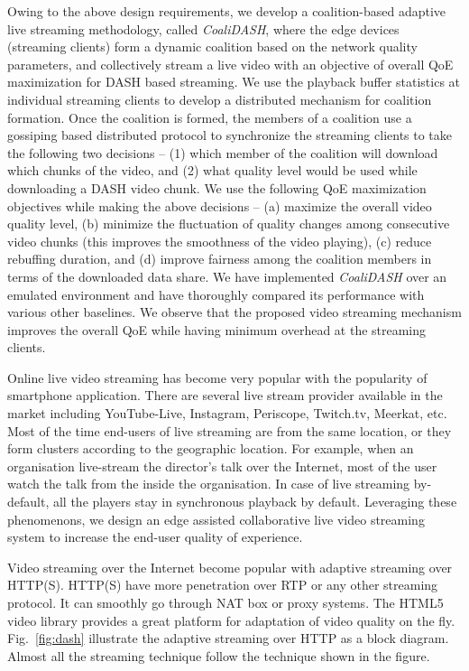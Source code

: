 Owing to the above design requirements, we develop a coalition-based adaptive live streaming methodology, called \textit{CoaliDASH}, where the edge devices (streaming clients) form a dynamic coalition based on the network quality parameters, and collectively stream a live video with an objective of overall QoE maximization for DASH based streaming. We use the playback buffer statistics at individual streaming clients to develop a distributed mechanism for coalition formation. Once the coalition is formed, the members of a coalition use a gossiping based distributed protocol to synchronize the streaming clients to take the following two decisions -- (1) which member of the coalition will download which chunks of the video, and (2) what quality level would be used while downloading a DASH video chunk. We use the following QoE maximization objectives while making the above decisions -- (a) maximize the overall video quality level, (b) minimize the fluctuation of quality changes among consecutive video chunks (this improves the smoothness of the video playing), (c) reduce rebuffing duration, and (d) improve fairness  among the coalition members in terms of the downloaded data share. We have implemented \textit{CoaliDASH} over an emulated environment and have thoroughly compared its performance with various other baselines. We observe that the proposed video streaming mechanism improves the overall QoE while having minimum overhead at the streaming clients. 


Online live video streaming has become very popular with the popularity of smartphone application. There are several live stream provider available in the market including YouTube-Live, Instagram, Periscope, Twitch.tv, Meerkat, etc. Most of the time end-users of live streaming are from the same location, or they form clusters according to the geographic location. For example, when an organisation live-stream the director's talk over the Internet, most of the user watch the talk from the inside the organisation. In case of live streaming by-default, all the players stay in synchronous playback by default. Leveraging these phenomenons, we design an edge assisted collaborative live video streaming system to increase the end-user quality of experience.

Video streaming over the Internet become popular with adaptive streaming over HTTP(S). HTTP(S) have more penetration over RTP or any other streaming protocol. It can smoothly go through NAT box or proxy systems. The HTML5 video library provides a great platform for adaptation of video quality on the fly. Fig.~\ref{fig:dash} illustrate the adaptive streaming over HTTP as a block diagram. Almost all the streaming technique follow the technique shown in the figure.

